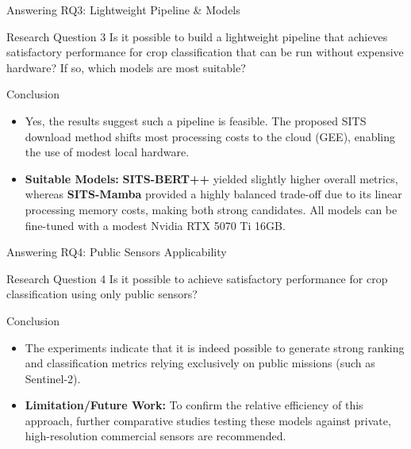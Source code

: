 \begin{frame}{Answering RQ3: Lightweight Pipeline \& Models}
    \begin{block}{Research Question 3}
        Is it possible to build a lightweight pipeline that achieves satisfactory performance for crop classification that can be run without expensive hardware? If so, which models are most suitable?
    \end{block}

    \begin{block}{Conclusion}
        \begin{itemize}
            \item Yes, the results suggest such a pipeline is feasible. The proposed SITS download method shifts most processing costs to the cloud (GEE), enabling the use of modest local hardware.
            \item \textbf{Suitable Models:} \textbf{SITS-BERT++} yielded slightly higher overall metrics, whereas \textbf{SITS-Mamba} provided a highly balanced trade-off due to its linear processing memory costs, making both strong candidates. All models can be fine-tuned with a modest Nvidia RTX 5070 Ti 16GB.
        \end{itemize}
    \end{block}
\end{frame}


\begin{frame}{Answering RQ4: Public Sensors Applicability}
    \begin{block}{Research Question 4}
        Is it possible to achieve satisfactory performance for crop classification using only public sensors?
    \end{block}

    \pause

    \begin{block}{Conclusion}
        \begin{itemize}
            \item The experiments indicate that it is indeed possible to generate strong ranking and classification metrics relying exclusively on public missions (such as Sentinel-2).
            \item \textbf{Limitation/Future Work:} To confirm the relative efficiency of this approach, further comparative studies testing these models against private, high-resolution commercial sensors are recommended.
        \end{itemize}
    \end{block}
\end{frame}

